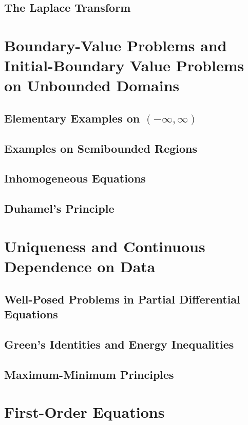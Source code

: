 \documentclass{amsbook}%
\theoremstyle{plain}
\numberwithin{equation}{section}
\begin{document}
	\section{The Laplace Transform}

\chapter{Boundary-Value Problems and Initial-Boundary Value Problems on Unbounded Domains}

	\section{Elementary Examples on $(-\infty,\infty)$}
	
	\section{Examples on Semibounded Regions}
	
	\section{Inhomogeneous Equations}
	
	\section{Duhamel's Principle}

\chapter{Uniqueness and Continuous Dependence on Data}

	\section{Well-Posed Problems in Partial Differential Equations}
	
	\section{Green's Identities and Energy Inequalities}
	
	\section{Maximum-Minimum Principles}

\chapter{First-Order Equations}
\end{document}
